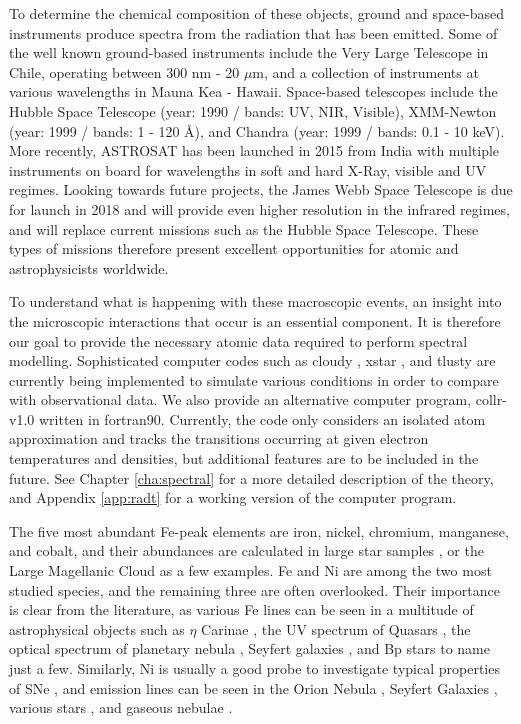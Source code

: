 To determine the chemical composition of these objects, ground and space-based instruments produce spectra from the radiation that has been emitted. Some of the well known ground-based instruments include the Very Large Telescope in Chile, operating between 300 nm - 20 $\mu$m, and a collection of instruments at various wavelengths in Mauna Kea - Hawaii. Space-based telescopes include the Hubble Space Telescope (year: 1990 / bands: UV, NIR, Visible),  XMM-Newton (year: 1999 / bands: 1 - 120 \AA), and Chandra (year: 1999 / bands: 0.1 - 10 keV). More recently, ASTROSAT has been launched in 2015 from India with multiple instruments on board for wavelengths in soft and hard X-Ray, visible and UV regimes. Looking towards future projects, the James Webb Space Telescope is due for launch in 2018 and will provide even higher resolution in the infrared regimes, and will replace current missions such as the Hubble Space Telescope. These types of missions therefore present excellent opportunities for atomic and astrophysicists worldwide.

To understand what is happening with these macroscopic events, an insight into the microscopic interactions that occur is an essential component. It is therefore our goal to provide the necessary atomic data required to perform spectral modelling. Sophisticated computer codes such as {\sc cloudy} \citep{1998PASP..110..761F}, {\sc xstar} \citep{2001ApJS..134..139B}, and {\sc tlusty} \citep{1995ApJ...439..875H} are currently being implemented to simulate various conditions in order to compare with observational data. We also provide an alternative computer program, {\sc collr-v1.0} written in {\sc fortran90}. Currently, the code only considers an isolated atom approximation and tracks the transitions occurring at given electron temperatures and densities, but additional features are to be included in the future. See Chapter \ref{cha:spectral} for a more detailed description of the theory, and Appendix \ref{app:radt} for a working version of the computer program.

The five most abundant Fe-peak elements are iron, nickel, chromium, manganese, and cobalt, and their abundances are calculated in large star samples \cite{2014AJ....148...67J}, or the Large Magellanic Cloud \cite{2012ApJ...746...29C} as a few examples. Fe and Ni are among the two most studied species, and the remaining three are often overlooked. Their importance is clear from the literature, as various Fe lines can be seen in a multitude of astrophysical objects such as $\eta$ Carinae \citep{2000A&A...361..977J}, the UV spectrum of Quasars \citep{2001ApJS..134....1V}, the optical spectrum of planetary nebula \citep{1981ApJ...248..569S, 1993ApJ...410..430K}, Seyfert galaxies \citep{1985ApJ...297..166O,1999ApJS..125..317L}, and Bp stars \citep{2007A&A...466.1083H} to name just a few. Similarly, Ni is usually a good probe to investigate typical properties of SNe \cite{2001ApJ...547..988M, 2009MNRAS.396.1659M}, and emission lines can be seen in the Orion Nebula \cite{1992ApJ...389..305O}, Seyfert Galaxies \cite{1990ApJ...352..561O}, various stars \cite{2001MNRAS.328..291T, 2004A&A...418.1073W}, and gaseous nebulae \cite{1995A&A...294..555L}.

